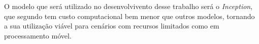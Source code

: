 O modelo que será utilizado no desenvolvivento desse trabalho será o \textit{Inception}, que segundo  tem custo computacional bem menor que outros modelos, tornando a sua utilização viável para cenários com recursos limitados como em processamento móvel.















 
     
